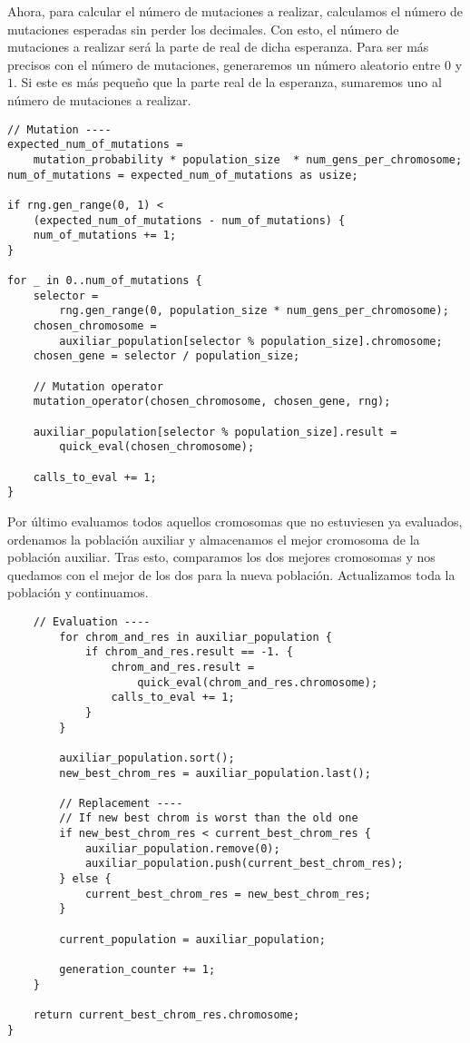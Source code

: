 \documentclass[size=a4, parskip=half, titlepage=false, toc=flat, toc=bib, 12pt]{scrartcl}
\begin{document}
Ahora, para calcular el número de mutaciones a realizar, calculamos el número de mutaciones esperadas sin perder los decimales. Con esto, el número de mutaciones a realizar será la parte de real de dicha esperanza. Para ser más precisos con el número de mutaciones, generaremos un número aleatorio entre $0$ y $1$. Si este es más pequeño que la parte real de la esperanza, sumaremos uno al número de mutaciones a realizar.

\begin{verbatim}
// Mutation ----
expected_num_of_mutations =
    mutation_probability * population_size  * num_gens_per_chromosome;
num_of_mutations = expected_num_of_mutations as usize;

if rng.gen_range(0, 1) <
    (expected_num_of_mutations - num_of_mutations) {
    num_of_mutations += 1;
}

for _ in 0..num_of_mutations {
    selector =
        rng.gen_range(0, population_size * num_gens_per_chromosome);
    chosen_chromosome =
        auxiliar_population[selector % population_size].chromosome;
    chosen_gene = selector / population_size;

    // Mutation operator
    mutation_operator(chosen_chromosome, chosen_gene, rng);

    auxiliar_population[selector % population_size].result =
        quick_eval(chosen_chromosome);

    calls_to_eval += 1;
}

\end{verbatim}

Por último evaluamos todos aquellos cromosomas que no estuviesen ya evaluados, ordenamos la población auxiliar y almacenamos el mejor cromosoma de la población auxiliar. Tras esto, comparamos los dos mejores cromosomas y nos quedamos con el mejor de los dos para la nueva población. Actualizamos toda la población y continuamos.

\begin{verbatim}
    // Evaluation ----
        for chrom_and_res in auxiliar_population {
            if chrom_and_res.result == -1. {
                chrom_and_res.result =
                    quick_eval(chrom_and_res.chromosome);
                calls_to_eval += 1;
            }
        }

        auxiliar_population.sort();
        new_best_chrom_res = auxiliar_population.last();

        // Replacement ----
        // If new best chrom is worst than the old one
        if new_best_chrom_res < current_best_chrom_res {
            auxiliar_population.remove(0);
            auxiliar_population.push(current_best_chrom_res);
        } else {
            current_best_chrom_res = new_best_chrom_res;
        }

        current_population = auxiliar_population;

        generation_counter += 1;
    }

    return current_best_chrom_res.chromosome;
}
\end{verbatim}
\end{document}

